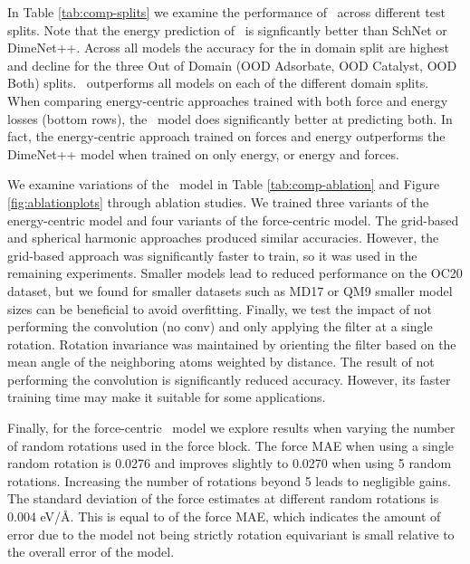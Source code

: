 In Table \ref{tab:comp-splits} we examine the performance of \model~across different test splits. Note that the energy prediction of \model~is signficantly better than SchNet or DimeNet++. Across all models the accuracy for the in domain split are highest and decline for the three Out of Domain (OOD Adsorbate, OOD Catalyst, OOD Both) splits. \model~outperforms all models on each of the different domain splits. When comparing energy-centric approaches trained with both force and energy losses (bottom rows), the \model~model does significantly better at predicting both. In fact, the energy-centric approach trained on forces and energy outperforms the DimeNet++ \cite{klicpera_dimenetpp_2020} model when trained on only energy, or energy and forces.

We examine variations of the \model~model in Table \ref{tab:comp-ablation} and Figure \ref{fig:ablationplots} through ablation studies. We trained three variants of the energy-centric model and four variants of the force-centric model. The grid-based and spherical harmonic approaches produced similar accuracies. However, the grid-based approach was significantly faster to train, so it was used in the remaining experiments. Smaller models lead to reduced performance on the OC20 dataset, but we found for smaller datasets such as MD17 or QM9 smaller model sizes can be beneficial to avoid overfitting. Finally, we test the impact of not performing the convolution (no conv) and only applying the filter at a single rotation. Rotation invariance was maintained by orienting the filter based on the mean angle of the neighboring atoms weighted by distance. The result of not performing the convolution is significantly reduced accuracy. However, its faster training time may make it suitable for some applications. 

Finally, for the force-centric \model~model we explore results when varying the number of random rotations used in the force block. The force MAE when using a single random rotation is 0.0276 and improves slightly to 0.0270 when using 5 random rotations. Increasing the number of rotations beyond 5 leads to negligible gains. The standard deviation of the force estimates at different random rotations is 0.004 eV/\AA. This is equal to  of the force MAE, which indicates the amount of error due to the model not being strictly rotation equivariant is small relative to the overall error of the model.

